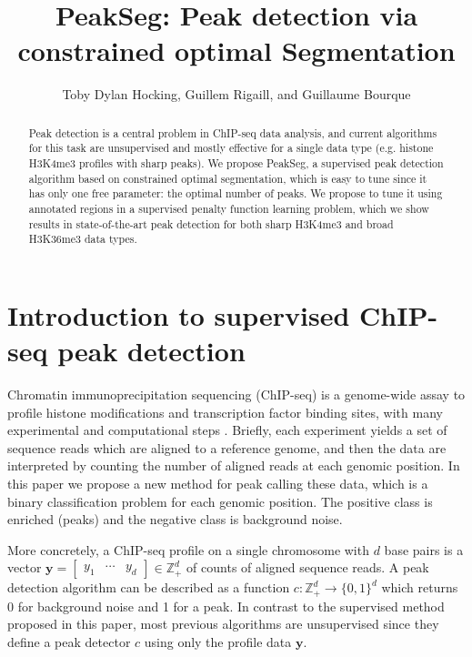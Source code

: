 \documentclass{article}
\newcommand{\ZZ}{\mathbb Z}
\begin{document}
\title{PeakSeg: \textbf{Peak} detection via constrained optimal
  \textbf{Seg}mentation}

\author{Toby Dylan Hocking,
  Guillem Rigaill, and Guillaume Bourque}

\maketitle

\begin{abstract}
  Peak detection is a central problem in ChIP-seq data analysis, and
  current algorithms for this task are unsupervised and mostly
  effective for a single data type (e.g. histone H3K4me3 profiles with
  sharp peaks). We propose PeakSeg, a supervised peak detection
  algorithm based on constrained optimal segmentation, which is easy
  to tune since it has only one free parameter: the optimal number of
  peaks. We propose to tune it using annotated regions in a supervised
  penalty function learning problem, which we show results in
  state-of-the-art peak detection for both sharp H3K4me3 and broad
  H3K36me3 data types.
\end{abstract}

\section{Introduction to supervised ChIP-seq peak detection}

Chromatin immunoprecipitation sequencing (ChIP-seq) is a genome-wide
assay to profile histone modifications and transcription factor
binding sites, with many experimental and computational steps
\citep{practical}. Briefly, each experiment yields a set of sequence
reads which are aligned to a reference genome, and then the data are
interpreted by counting the number of aligned reads at each genomic
position. In this paper we propose a new method for peak calling these
data, which is a binary classification problem for each genomic
position. The positive class is enriched (peaks) and the negative
class is background noise.

More concretely, a ChIP-seq profile on a single
chromosome with $d$ base pairs is a vector $\mathbf y=
\left[
  \begin{array}{ccc}
    y_1 & \cdots & y_d
  \end{array}
\right]\in\ZZ_+^d$ of counts of aligned sequence reads. A peak
detection algorithm can be described as a function $c:\ZZ_+^d
\rightarrow \{0, 1\}^d$ which returns 0 for background noise and 1 for
a peak. In contrast to the supervised method proposed in this paper,
most previous algorithms are unsupervised since they define a peak
detector $c$ using only the profile data $\mathbf y$.
\end{document}
